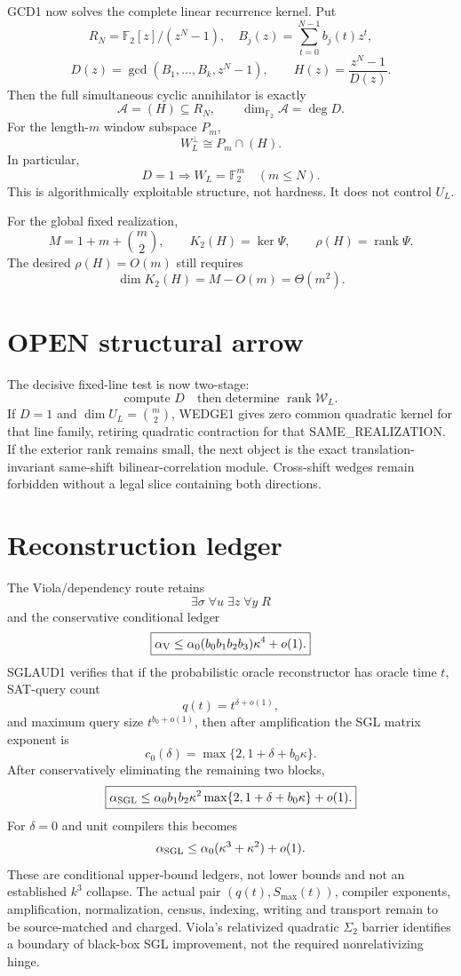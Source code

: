 \documentclass[11pt]{article}
\begin{document}
GCD1 now solves the complete linear recurrence kernel. Put
\[
R_N=\mathbb F_2[z]/(z^N-1),\quad
B_j(z)=\sum_{t=0}^{N-1}b_j(t)z^t,
\]
\[
D(z)=\gcd(B_1,\ldots,B_k,z^N-1),\qquad
H(z)=\frac{z^N-1}{D(z)}.
\]
Then the full simultaneous cyclic annihilator is exactly
\[
\boxed{\mathcal A=(H)\subseteq R_N,\qquad \dim_{\mathbb F_2}\mathcal A=\deg D.}
\]
For the length-\(m\) window subspace \(P_m\),
\[
\boxed{W_L^\perp\cong P_m\cap(H).}
\]
In particular,
\[
\boxed{D=1\Longrightarrow W_L=\mathbb F_2^m\quad(m\le N).}
\]
This is algorithmically exploitable structure, not hardness. It does not control \(U_L\).

For the global fixed realization,
\[
M=1+m+\binom m2,\qquad K_2(H)=\ker\Psi,\qquad \rho(H)=\operatorname{rank}\Psi.
\]
The desired \(\rho(H)=O(m)\) still requires
\[
\boxed{\dim K_2(H)=M-O(m)=\Theta(m^2).}
\]

\section*{OPEN structural arrow}
The decisive fixed-line test is now two-stage:
\[
\boxed{\text{compute }D\quad\text{then determine }\operatorname{rank}\mathcal W_L.}
\]
If \(D=1\) and \(\dim U_L=\binom m2\), WEDGE1 gives zero common quadratic kernel for that line family, retiring quadratic contraction for that SAME\_REALIZATION. If the exterior rank remains small, the next object is the exact translation-invariant same-shift bilinear-correlation module. Cross-shift wedges remain forbidden without a legal slice containing both directions.

\section*{Reconstruction ledger}
The Viola/dependency route retains
\[
\exists\sigma\;\forall u\;\exists z\;\forall y\;R
\]
and the conservative conditional ledger
\[
\boxed{\alpha_{\rm V}\le
\alpha_0(b_0b_1b_2b_3)\kappa^4+o(1).}
\]
SGLAUD1 verifies that if the probabilistic oracle reconstructor has oracle time \(t\), SAT-query count
\[
q(t)=t^{\delta+o(1)},
\]
and maximum query size \(t^{b_0+o(1)}\), then after amplification the SGL matrix exponent is
\[
\boxed{c_0(\delta)=\max\{2,1+\delta+b_0\kappa\}.}
\]
After conservatively eliminating the remaining two blocks,
\[
\boxed{\alpha_{\rm SGL}\le
\alpha_0b_1b_2\kappa^2
\max\{2,1+\delta+b_0\kappa\}+o(1).}
\]
For \(\delta=0\) and unit compilers this becomes
\[
\alpha_{\rm SGL}\le\alpha_0(\kappa^3+\kappa^2)+o(1).
\]
These are conditional upper-bound ledgers, not lower bounds and not an established \(k^3\) collapse. The actual pair \((q(t),S_{\max}(t))\), compiler exponents, amplification, normalization, census, indexing, writing and transport remain to be source-matched and charged. Viola's relativized quadratic \(\Sigma_2\) barrier identifies a boundary of black-box SGL improvement, not the required nonrelativizing hinge.
\end{document}
